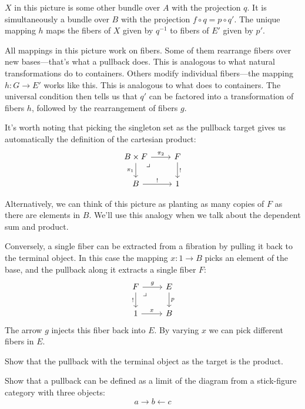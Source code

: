 \documentclass[DaoFP]{subfiles}
\begin{document}
$X$ in this picture is some other bundle over $A$ with the projection $q$. It is simultaneously a bundle over $B$ with the projection $f \circ q = p \circ q'$. The unique mapping $h$ maps the fibers of $X$ given by $q^{-1}$ to fibers of $E'$ given by $p'$. 

All mappings in this picture work on fibers. Some of them rearrange fibers over new bases---that's what a pullback does. This is analogous to what natural transformations do to containers. Others modify individual fibers---the mapping $h \colon G \to E'$ works like this. This is analogous to what  does to containers. The universal condition then tells us that $q'$ can be factored into a transformation of fibers $h$, followed by the rearrangement of fibers $g$.

It's worth noting that picking the singleton set as the pullback target gives us automatically the definition of the cartesian product:
\[
 \begin{tikzcd}
 B \times F
 \arrow[d, "\pi_1"']
 \arrow[r, "\pi_2"]
\arrow[dr, phantom,  , very near start, "\lrcorner"]
 & F
 \arrow[d, "!"]
 \\
 B
 \arrow[r, "!"]
 &
 1
  \end{tikzcd}
\]

Alternatively, we can think of this picture as planting as many copies of $F$ as there are elements in $B$. We'll use this analogy when we talk about the dependent sum and product.

Conversely, a single fiber can be extracted from a fibration by pulling it back to the terminal object. In this case the mapping $x \colon 1 \to B$ picks an element of the base, and the pullback along it extracts a single fiber $F$:
\[
 \begin{tikzcd}
 F
 \arrow[d, "!"']
 \arrow[r, "g"]
\arrow[dr, phantom,  , very near start, "\lrcorner"]
 & E
 \arrow[d, "p"]
 \\
 1
 \arrow[r, "x"]
 &
 B
  \end{tikzcd}
\]
The arrow $g$ injects this fiber back into $E$. By varying $x$ we can pick different fibers in $E$.

\begin{exercise}
Show that the pullback with the terminal object as the target is the product.
\end{exercise}
\begin{exercise}
Show that a pullback can be defined as a limit of the diagram from a stick-figure category with three objects:
\[ a \rightarrow b \leftarrow c \]
\end{exercise}
\end{document}
